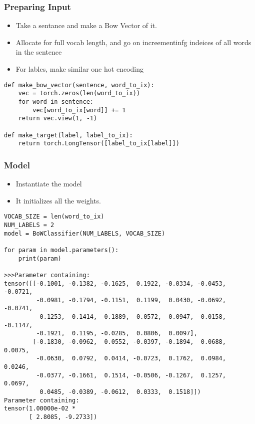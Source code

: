 \begin{frame}[fragile]
\frametitle{Preparing Input}

\begin{itemize}
\item Take a sentance and make a Bow Vector of it.
\item Allocate for full vocab length, and go on increementinfg indeices of all words in the sentence
\item For lables, make similar one hot encoding
\end{itemize}
 \begin{lstlisting}
def make_bow_vector(sentence, word_to_ix):
    vec = torch.zeros(len(word_to_ix))
    for word in sentence:
        vec[word_to_ix[word]] += 1
    return vec.view(1, -1)

def make_target(label, label_to_ix):
    return torch.LongTensor([label_to_ix[label]])
\end{lstlisting}              
\end{frame} 


\begin{frame}[fragile]
\frametitle{Model}

\begin{itemize}
\item Instantiate the model
\item It initializes all the weights.
\end{itemize}
 \begin{lstlisting}
VOCAB_SIZE = len(word_to_ix)
NUM_LABELS = 2 
model = BoWClassifier(NUM_LABELS, VOCAB_SIZE)

for param in model.parameters():
    print(param)
    
>>>Parameter containing:
tensor([[-0.1001, -0.1382, -0.1625,  0.1922, -0.0334, -0.0453, -0.0721,
         -0.0981, -0.1794, -0.1151,  0.1199,  0.0430, -0.0692, -0.0741,
          0.1253,  0.1414,  0.1889,  0.0572,  0.0947, -0.0158, -0.1147,
         -0.1921,  0.1195, -0.0285,  0.0806,  0.0097],
        [-0.1830, -0.0962,  0.0552, -0.0397, -0.1894,  0.0688,  0.0075,
         -0.0630,  0.0792,  0.0414, -0.0723,  0.1762,  0.0984,  0.0246,
         -0.0377, -0.1661,  0.1514, -0.0506, -0.1267,  0.1257,  0.0697,
          0.0485, -0.0389, -0.0612,  0.0333,  0.1518]])
Parameter containing:
tensor(1.00000e-02 *
       [ 2.8085, -9.2733])    
\end{lstlisting}              
\end{frame} 


